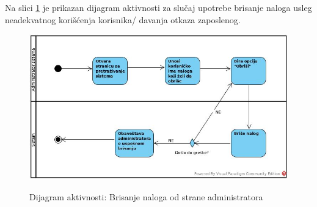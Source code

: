 \documentclass[20pt]{article}
\begin{document}
\begin{center}
\begin{longtable}{p{0.23\linewidth} p{0.77\linewidth}}
\end{longtable}
\end{center}

\setlength{\parindent}{1cm}
\fontsize{13}{18} \selectfont 
Na slici \ref{fig:dijagramAktivnostiBrisanjeAdministrator} je prikazan dijagram aktivnosti za slu\v{c}aj upotrebe brisanje naloga usleg neadekvatnog kori\v {s}\' cenja korisnika/ davanja otkaza zaposlenog.

\begin{figure}[h]
        \centering
        \includegraphics[width=1.1\textwidth,height=0.60\textheight]{Pictures/BrisanjeNalogaUsledNeadekvatnogKoriscenja.jpg}\\
        \caption{Dijagram aktivnosti: Brisanje naloga od strane administratora}
        \label{fig:dijagramAktivnostiBrisanjeAdministrator}
    \end{figure}
    
\newpage
\end{document}
